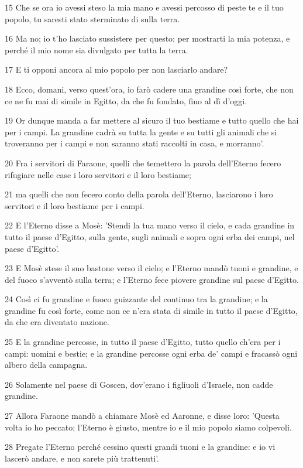 \par 15 Che se ora io avessi steso la mia mano e avessi percosso di peste te e il tuo popolo, tu saresti stato sterminato di sulla terra.
\par 16 Ma no; io t'ho lasciato sussistere per questo: per mostrarti la mia potenza, e perché il mio nome sia divulgato per tutta la terra.
\par 17 E ti opponi ancora al mio popolo per non lasciarlo andare?
\par 18 Ecco, domani, verso quest'ora, io farò cadere una grandine così forte, che non ce ne fu mai di simile in Egitto, da che fu fondato, fino al dì d'oggi.
\par 19 Or dunque manda a far mettere al sicuro il tuo bestiame e tutto quello che hai per i campi. La grandine cadrà su tutta la gente e su tutti gli animali che si troveranno per i campi e non saranno stati raccolti in casa, e morranno'.
\par 20 Fra i servitori di Faraone, quelli che temettero la parola dell'Eterno fecero rifugiare nelle case i loro servitori e il loro bestiame;
\par 21 ma quelli che non fecero conto della parola dell'Eterno, lasciarono i loro servitori e il loro bestiame per i campi.
\par 22 E l'Eterno disse a Mosè: 'Stendi la tua mano verso il cielo, e cada grandine in tutto il paese d'Egitto, sulla gente, sugli animali e sopra ogni erba dei campi, nel paese d'Egitto'.
\par 23 E Mosè stese il suo bastone verso il cielo; e l'Eterno mandò tuoni e grandine, e del fuoco s'avventò sulla terra; e l'Eterno fece piovere grandine sul paese d'Egitto.
\par 24 Così ci fu grandine e fuoco guizzante del continuo tra la grandine; e la grandine fu così forte, come non ce n'era stata di simile in tutto il paese d'Egitto, da che era diventato nazione.
\par 25 E la grandine percosse, in tutto il paese d'Egitto, tutto quello ch'era per i campi: uomini e bestie; e la grandine percosse ogni erba de' campi e fracassò ogni albero della campagna.
\par 26 Solamente nel paese di Goscen, dov'erano i figliuoli d'Israele, non cadde grandine.
\par 27 Allora Faraone mandò a chiamare Mosè ed Aaronne, e disse loro: 'Questa volta io ho peccato; l'Eterno è giusto, mentre io e il mio popolo siamo colpevoli.
\par 28 Pregate l'Eterno perché cessino questi grandi tuoni e la grandine: e io vi lascerò andare, e non sarete più trattenuti'.
